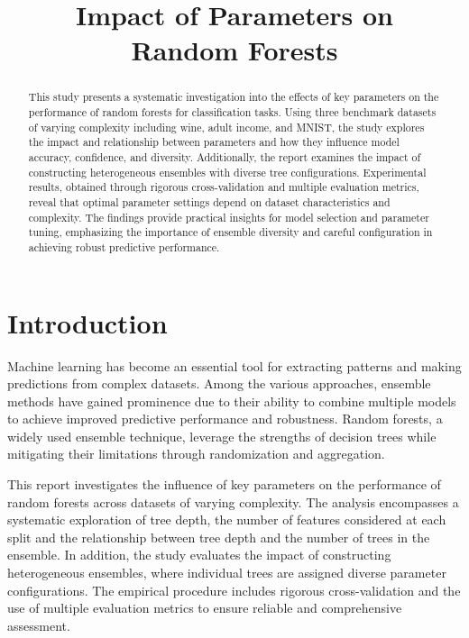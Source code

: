 \documentclass[conference]{IEEEtran}
\begin{document}
\title{Impact of Parameters on\\ Random Forests}

\author{
}

\maketitle

\begin{abstract}
This study presents a systematic investigation into the effects of key parameters on the performance of random forests for classification tasks. Using three benchmark datasets of varying complexity including wine, adult income, and MNIST, the study explores the impact and relationship between parameters and how they influence model accuracy, confidence, and diversity. Additionally, the report examines the impact of constructing heterogeneous ensembles with diverse tree configurations. Experimental results, obtained through rigorous cross-validation and multiple evaluation metrics, reveal that optimal parameter settings depend on dataset characteristics and complexity. The findings provide practical insights for model selection and parameter tuning, emphasizing the importance of ensemble diversity and careful configuration in achieving robust predictive performance.
\end{abstract}

\section{Introduction}

Machine learning has become an essential tool for extracting patterns and making predictions from complex datasets. Among the various approaches, ensemble methods have gained prominence due to their ability to combine multiple models to achieve improved predictive performance and robustness. Random forests, a widely used ensemble technique, leverage the strengths of decision trees while mitigating their limitations through randomization and aggregation.

This report investigates the influence of key parameters on the performance of random forests across datasets of varying complexity. The analysis encompasses a systematic exploration of tree depth, the number of features considered at each split and the relationship between tree depth and the number of trees in the ensemble. In addition, the study evaluates the impact of constructing heterogeneous ensembles, where individual trees are assigned diverse parameter configurations. The empirical procedure includes rigorous cross-validation and the use of multiple evaluation metrics to ensure reliable and comprehensive assessment.
\end{document}
